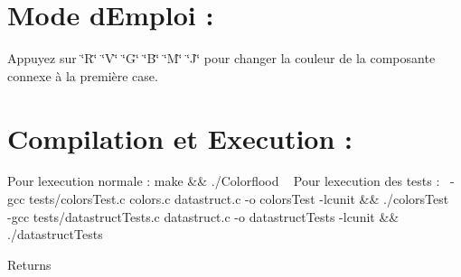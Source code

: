 \hypertarget{index_intro_sec}{}\section{Mode d\textquotesingle{}\+Emploi \+:}\label{index_intro_sec}
Appuyez sur \char`\"{}\+R\char`\"{} \char`\"{}\+V\char`\"{} \char`\"{}\+G\char`\"{} \char`\"{}\+B\char`\"{} \char`\"{}\+M\char`\"{} \char`\"{}\+J\char`\"{} pour changer la couleur de la composante connexe à la première case.\hypertarget{index_install_sec}{}\section{Compilation et Execution \+:}\label{index_install_sec}
Pour l\textquotesingle{}execution normale \+: make \&\& ./\+Colorflood ~\newline
Pour l\textquotesingle{}execution des tests \+:~\newline
-\/gcc tests/colors\+Test.\+c colors.\+c datastruct.\+c -\/o colors\+Test -\/lcunit \&\& ./colors\+Test ~\newline
-\/gcc tests/datastruct\+Tests.\+c datastruct.\+c -\/o datastruct\+Tests -\/lcunit \&\& ./datastruct\+Tests \begin{DoxyReturn}{Returns}

\end{DoxyReturn}
